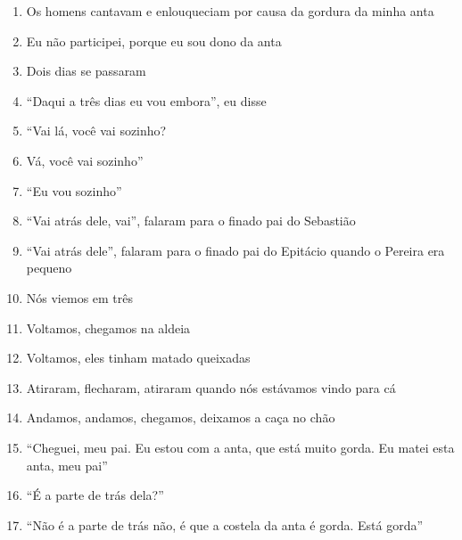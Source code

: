 \begin{enumerate}
 \item Os homens cantavam e enlouqueciam por causa da gordura da minha anta

 \item Eu não participei, porque eu sou dono da anta

 \begin{center}\end{center}

 \item Dois dias se passaram

 \item ``Daqui a três dias eu vou embora'', eu disse

 \item ``Vai lá, você vai sozinho?

 \item Vá, você vai sozinho''

 \item ``Eu vou sozinho''

 \item ``Vai atrás dele, vai'', falaram para o finado pai do Sebastião

 \item ``Vai atrás dele'', falaram para o finado pai do Epitácio quando o
 Pereira era pequeno

 \item Nós viemos em três

 \item Voltamos, chegamos na aldeia

 \begin{center}\end{center}

 \item Voltamos, eles tinham matado queixadas

 \item Atiraram, flecharam, atiraram quando nós estávamos vindo para cá

 \item Andamos, andamos, chegamos, deixamos a caça no chão

 \item ``Cheguei, meu pai. Eu estou com a anta, que está muito gorda. Eu matei esta anta, meu pai''

 \item ``É a parte de trás dela?''

 \item ``Não é a parte de trás não, é que a costela da anta é gorda. Está gorda''


\end{enumerate}
